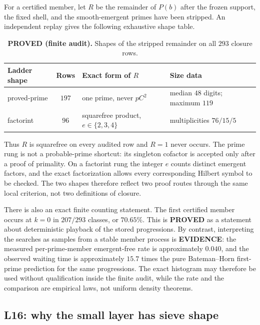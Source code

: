 For a certified member, let $R$ be the remainder of $P(b)$ after the
frozen support, the fixed shell, and the smooth-emergent primes have
been stripped.  An independent replay gives the following exhaustive
shape table.

\begin{table}[ht]
\centering
\begin{tabular}{@{}lcll@{}}
\toprule
Ladder shape & Rows & Exact form of $R$ & Size data \\
\midrule
proved-prime & $197$ & one prime, never $pC^2$ & median $48$ digits; maximum $119$ \\ %
factorint & $96$ & squarefree product, $e\in\{2,3,4\}$ & multiplicities $76/15/5$ \\ %
\bottomrule
\end{tabular}
\caption{\textbf{PROVED (finite audit).}  Shapes of the stripped
remainder on all $293$ closure rows.}
\end{table}

Thus $R$ is squarefree on every audited row and $R=1$ never occurs.
The prime rung is not a probable-prime shortcut: its singleton cofactor
is accepted only after a proof of primality.  On a factorint rung the
integer $e$ counts distinct emergent factors, and the exact
factorization allows every corresponding Hilbert symbol to be checked.
The two shapes therefore reflect two proof routes through the same
local criterion, not two definitions of closure.

There is also an exact finite counting statement.  The first certified
member occurs at $k=0$ in $207/293$ classes, or $70.65\%$.
This is \textbf{PROVED} as a statement about deterministic playback of
the stored progressions.  By contrast, interpreting the searches as
samples from a stable member process is \textbf{EVIDENCE}: the measured
per-prime-member emergent-free rate is approximately $0.040$, and the
observed waiting time is approximately $15.7$ times the pure
Bateman--Horn \cite{batemanhorn} first-prime prediction for the same
progressions.
The exact histogram may therefore be used without qualification inside
the finite audit, while the rate and the comparison are empirical laws,
not uniform density theorems.

\subsection{L16: why the small layer has sieve shape}

